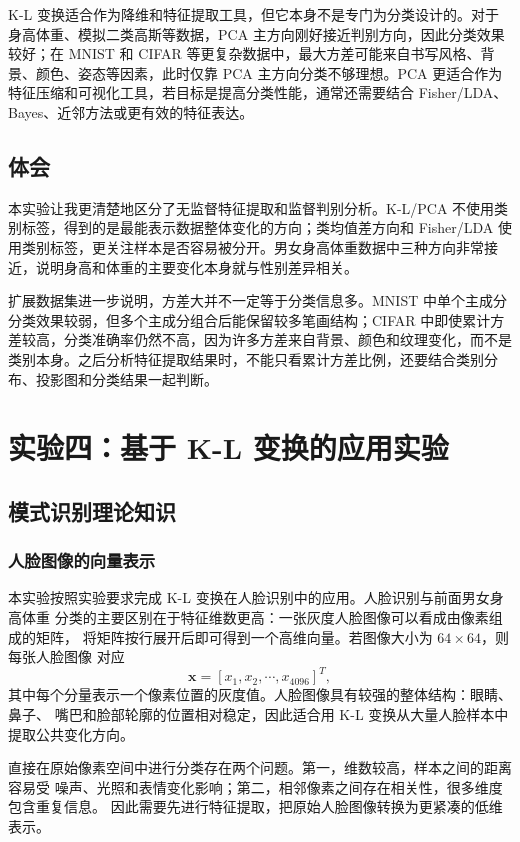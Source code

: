 \documentclass[UTF8,a4paper,12pt]{ctexart}
\begin{document}
K-L 变换适合作为降维和特征提取工具，但它本身不是专门为分类设计的。对于身高体重、模拟二类高斯等数据，PCA 主方向刚好接近判别方向，因此分类效果较好；在 MNIST 和 CIFAR 等更复杂数据中，最大方差可能来自书写风格、背景、颜色、姿态等因素，此时仅靠 PCA 主方向分类不够理想。PCA 更适合作为特征压缩和可视化工具，若目标是提高分类性能，通常还需要结合 Fisher/LDA、Bayes、近邻方法或更有效的特征表达。

\subsection{体会}

本实验让我更清楚地区分了无监督特征提取和监督判别分析。K-L/PCA 不使用类别标签，得到的是最能表示数据整体变化的方向；类均值差方向和 Fisher/LDA 使用类别标签，更关注样本是否容易被分开。男女身高体重数据中三种方向非常接近，说明身高和体重的主要变化本身就与性别差异相关。

扩展数据集进一步说明，方差大并不一定等于分类信息多。MNIST 中单个主成分分类效果较弱，但多个主成分组合后能保留较多笔画结构；CIFAR 中即使累计方差较高，分类准确率仍然不高，因为许多方差来自背景、颜色和纹理变化，而不是类别本身。之后分析特征提取结果时，不能只看累计方差比例，还要结合类别分布、投影图和分类结果一起判断。
\clearpage
\section{实验四：基于 K-L 变换的应用实验}

\subsection{模式识别理论知识}

\subsubsection{人脸图像的向量表示}

本实验按照实验要求完成 K-L 变换在人脸识别中的应用。人脸识别与前面男女身高体重
分类的主要区别在于特征维数更高：一张灰度人脸图像可以看成由像素组成的矩阵，
将矩阵按行展开后即可得到一个高维向量。若图像大小为 $64\times64$，则每张人脸图像
对应
\[
  \mathbf{x}=[x_1,x_2,\cdots,x_{4096}]^T,
\]
其中每个分量表示一个像素位置的灰度值。人脸图像具有较强的整体结构：眼睛、鼻子、
嘴巴和脸部轮廓的位置相对稳定，因此适合用 K-L 变换从大量人脸样本中提取公共变化方向。

直接在原始像素空间中进行分类存在两个问题。第一，维数较高，样本之间的距离容易受
噪声、光照和表情变化影响；第二，相邻像素之间存在相关性，很多维度包含重复信息。
因此需要先进行特征提取，把原始人脸图像转换为更紧凑的低维表示。
\end{document}
